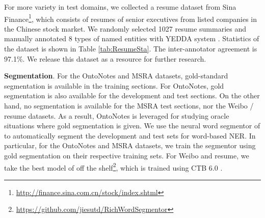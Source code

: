 \documentclass[11pt,a4paper]{article}
\begin{document}
\begin{CJK*}{UTF8}{gbsn}
\begin{table}[!tp]
\begin{center}
\end{center}
\caption{Detailed statistics of resume NER.}
\label{tab:ResumeSta}
\end{table}


For more variety in test domains, we collected a resume dataset from Sina Finance\footnote{\url{http://finance.sina.com.cn/stock/index.shtml}}, which consists of resumes of senior executives from listed companies in the Chinese stock market. We randomly selected 1027 resume summaries and manually annotated 8 types of named entities with YEDDA system \cite{yang2017yedda}. Statistics of the dataset is shown in Table \ref{tab:ResumeSta}. The inter-annotator agreement is 97.1\%. We release this dataset as a resource for further research.

\textbf{Segmentation}. For the OntoNotes and MSRA datasets, gold-standard segmentation is available in the training sections. For OntoNotes, gold segmentation is also available for the development and test sections.  On the other hand, no segmentation is available for the MSRA test sections, nor the Weibo / resume datasets. As a result, OntoNotes is leveraged for studying oracle situations where gold segmentation is given. We use the neural word segmentor of \citet{yang-zhang-dong:2017:Long} to automatically segment the development and test sets for word-based NER. In particular, for the OntoNotes and MSRA datasets, we train the segmentor using gold segmentation on their respective training sets. For Weibo and resume, we take the best model of \citet{yang-zhang-dong:2017:Long} off the shelf\footnote{\url{https://github.com/jiesutd/RichWordSegmentor}}, which is trained using CTB 6.0 \cite{xue2005penn}.


\end{CJK*}
\end{document}

